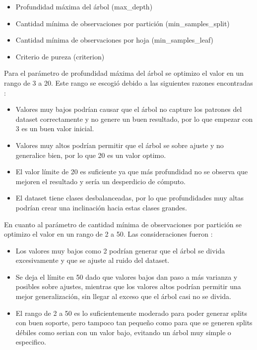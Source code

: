 \documentclass[12pt,a4paper]{article}
\begin{document}
\begin{itemize}
  \item Profundidad máxima del árbol (max\_depth)
  \item Cantidad mínima de observaciones por partición (min\_samples\_split)
  \item Cantidad mínima de observaciones por hoja (min\_samples\_leaf)
  \item Criterio de pureza (criterion)
\end{itemize}

Para el parámetro de profundidad máxima del árbol se optimizo el valor en un rango de 3 a 20. Este rango se escogió debido
a las siguientes razones encontradas \autocite{sklearnerConfigureDecisionTreeClassifierMax_depth,scikitlearnDecisionTrees,christinaellisMaxDepthRandom2022}:
\begin{itemize}
  \item Valores muy bajos podrían causar que el árbol no capture los patrones del dataset correctamente y no genere un buen resultado,
    por lo que empezar con 3 es un buen valor inicial.
  \item Valores muy altos podrían permitir que el árbol se sobre ajuste y no generalice bien, por lo que 20 es un valor optimo.
  \item El valor límite de 20 es suficiente ya que más profundidad no se observa que mejoren el resultado y sería un desperdicio de cómputo.
  \item El dataset tiene clases desbalanceadas,
    por lo que profundidades muy altas podrían crear una inclinación hacia estas clases grandes.
\end{itemize}

En cuanto al parámetro de cantidad mínima de observaciones por partición se optimizo el valor en un rango de 2 a 50.
Las consideraciones fueron \autocite{mDecisionTreesSplit2024,gibbinsVisualGuideTuning2025}:
\begin{itemize}
  \item Los valores muy bajos como 2 podrían generar que el árbol se divida excesivamente y que se ajuste al ruido del dataset.
  \item Se deja el límite en 50 dado que valores bajos dan paso a más varianza y posibles sobre ajustes,
    mientras que los valores altos podrían permitir una mejor generalización, sin llegar al exceso
    que el árbol casi no se divida.
  \item El rango de 2 a 50 es lo suficientemente moderado para poder generar splits con buen soporte,
    pero tampoco tan pequeño como para que se generen splits débiles como serian con un valor bajo, evitando un árbol muy simple o especifico.
\end{itemize}
\end{document}
